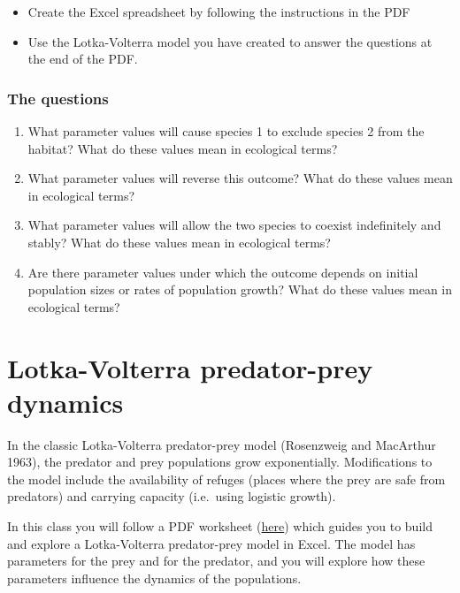 \documentclass[
  a4paper]{book}
\providecommand{\tightlist}{%
  \setlength{\itemsep}{0pt}\setlength{\parskip}{0pt}}
\begin{document}
\begin{itemize}
\tightlist
\item
  Create the Excel spreadsheet by following the instructions in the PDF
\item
  Use the Lotka-Volterra model you have created to answer the questions
  at the end of the PDF.
\end{itemize}

\hypertarget{the-questions}{%
\subsection{The questions}\label{the-questions}}

\begin{enumerate}
\def\labelenumi{\arabic{enumi}.}
\tightlist
\item
  What parameter values will cause species 1 to exclude species 2 from
  the habitat? What do these values mean in ecological terms?
\item
  What parameter values will reverse this outcome? What do these values
  mean in ecological terms?
\item
  What parameter values will allow the two species to coexist
  indefinitely and stably? What do these values mean in ecological
  terms?
\item
  Are there parameter values under which the outcome depends on initial
  population sizes or rates of population growth? What do these values
  mean in ecological terms?
\end{enumerate}

\hypertarget{lotka-volterra-predator-prey-dynamics}{%
\chapter{Lotka-Volterra predator-prey
dynamics}\label{lotka-volterra-predator-prey-dynamics}}

In the classic Lotka-Volterra predator-prey model (Rosenzweig and
MacArthur 1963), the predator and prey populations grow exponentially.
Modifications to the model include the availability of refuges (places
where the prey are safe from predators) and carrying capacity
(i.e.~using logistic growth).

In this class you will follow a PDF worksheet
(\href{https://www.dropbox.com/s/bhwoe161wp9p6hp/10.\%20Predator-prey\%20dynamics.pdf?dl=1}{here})
which guides you to build and explore a Lotka-Volterra predator-prey
model in Excel. The model has parameters for the prey and for the
predator, and you will explore how these parameters influence the
dynamics of the populations.
\end{document}
